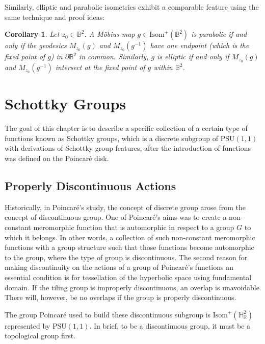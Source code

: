 \documentclass[12pt,oneside]{sfsuthesis}
\theoremstyle{plain} %
\newtheorem{corollary}[theorem]{Corollary}
\theoremstyle{definition}  %
\theoremstyle{remark}  %
\theoremstyle{plain}
\begin{document}
{Similarly, elliptic and parabolic isometries exhibit a comparable feature using the same technique and proof ideas:
\begin{corollary}\label{parabolic and elliptic lines}
Let $z_0\in\mathbb{B}^2$. A M\"{o}bius map $g\in\text{Isom}^+(\mathbb{B}^2)$ is parabolic if and only if the geodesics $M_{z_0}(g)$ and $M_{z_0}(g^{-1})$ have one endpoint (which is the fixed point of $g$) in $\partial\mathbb{B}^2$ in common. Similarly, $g$ is elliptic if and only if $M_{z_0}(g)$ and $M_{z_0}(g^{-1})$ intersect at the fixed point of $g$ within $\mathbb{B}^2$.
\end{corollary}

\chapter{Schottky Groups}\label{discrete groups}

The goal of this chapter is to describe a specific collection of a certain type of functions known as Schottky groups, which is a discrete subgroup of $\text{PSU}(1,1)$ with derivations of Schottky group features, after the introduction of functions was defined on the Poincar\'{e} disk.


\section{Properly Discontinuous Actions}\label{Properly Discontinuous Actions}

Historically, in Poincar\'{e}’s study, the concept of discrete group arose from the concept of discontinuous group. One of Poincar\'{e}’s aims was to create a non-constant meromorphic function that is automorphic in respect to a group $G$ to which it belongs. In other words, a collection of such non-constant meromorphic functions with a group structure such that those functions become automorphic to the group, where the type of group is discontinuous. The second reason for making discontinuity on the actions of a group of Poincar\'{e}'s functions an essential condition is for tessellation of the hyperbolic space using fundamental domain\cite{poincare1882theorie}. If the tiling group is improperly discontinuous, an overlap is unavoidable. There will, however, be no overlaps if the group is properly discontinuous.

The group Poincar\'{e} used to build these discontinuous subgroup is $\text{Isom}^+(\mathbb{H}^2_\mathbb{R})$ represented by $\text{PSU}(1,1)$. In brief, to be a discontinuous group, it must be a topological group first. 

}
\end{document}
